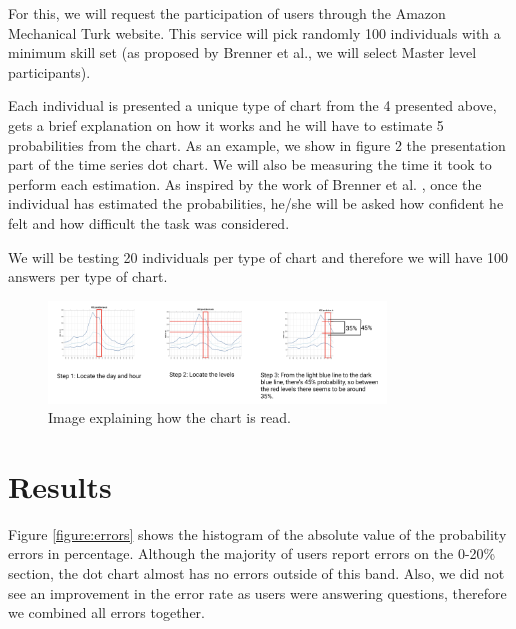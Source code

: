 \documentclass[a4paper,3p,sort&compress]{elsarticle}
\begin{document}
For this, we will request the participation of users through the Amazon Mechanical Turk website. 
This service will pick randomly 100 individuals with a minimum skill set (as proposed by Brenner 
et al., we will select Master level participants).

Each individual is presented a unique type of chart from the 4 presented above, gets a brief 
explanation on how it works and he will have to estimate 5 probabilities from the chart. As an 
example, we show in figure 2 the presentation part of the time series dot chart. We will also 
be measuring the time it took to perform each estimation. As inspired by the work of Brenner et 
al. , once the individual has estimated the probabilities, he/she will be asked how confident he 
felt and how difficult the task was considered.

We will be testing 20 individuals per type of chart and therefore we will have 100 answers per 
type of chart.

\begin{figure}
  \centering
  \includegraphics[width=0.8\textwidth]{dot_explanation}
  \caption{\label{figure:explanation} Image explaining how the chart is read.  }
\end{figure}  

\section{Results}
\label{sec:results}

Figure \ref{figure:errors} shows the histogram of the absolute value of the probability errors in percentage. 
Although the majority 
of users report errors on the 0-20\% section, the dot chart almost has no errors outside of this band. 
Also, we did not see an improvement in 
the error rate as users were answering questions, therefore we combined all errors together.
\end{document}
